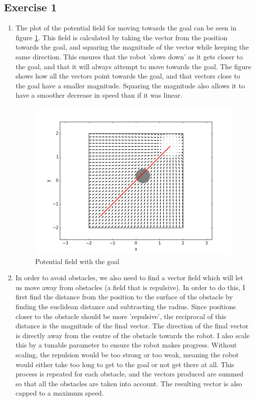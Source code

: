 \documentclass[12pt,a4paper]{article}
\begin{document}
\subsection*{Exercise 1}
\begin{enumerate}[label=(\alph*)]
	\item The plot of the potential field for moving towards the goal can be seen in figure \ref{fig:goal_mode}. This field is calculated by taking the vector from the position towards the goal, and squaring the magnitude of the vector while keeping the same direction. This ensures that the robot 'slows down' as it gets closer to the goal, and that it will always attempt to move towards the goal. The figure shows how all the vectors point towards the goal, and that vectors close to the goal have a smaller magnitude. Squaring the magnitude also allows it to have a smoother decrease in speed than if it was linear.
	\begin{figure}[!htb]
		\centering
		\includegraphics[width=12cm]{fig/1a.png}
		\caption{Potential field with the goal}
		\label{fig:goal_mode}
	\end{figure}
	\item In order to avoid obstacles, we also need to find a vector field which will let us move away from obstacles (a field that is repulsive). In order to do this, I first find the distance from the position to the surface of the  obstacle by finding the euclidean distance and subtracting the radius. Since positions closer to the obstacle should be more 'repulsive', the reciprocal of this distance is the magnitude of the final vector. The direction of the final vector is directly away from the centre of the obstacle towards the robot. I also scale this by a tunable parameter to ensure the robot makes progress. Without scaling, the repulsion would be too strong or too weak, meaning the robot would either take too long to get to the goal or not get there at all. This process is repeated for each obstacle, and the vectors produced are summed so that all the obstacles are taken into account. The resulting vector is also capped to a maximum speed.

\end{enumerate}
\end{document}

